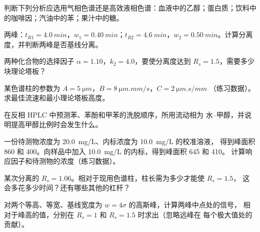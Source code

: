 \begin{exercise}[$\star$]\label{exo:b2:chromatography:4}
判断下列分析应选用气相色谱还是高效液相色谱：血液中的乙醇；蛋白质；饮料中的咖啡因；汽油中的苯；果汁中的糖。
\end{exercise}

\begin{exercise}[$\star\star$]\label{exo:b2:chromatography:5}
两峰：$t_{R1} = \qty{4.0}{min}$，$w_1 = \qty{0.40}{min}$；$t_{R2} = \qty{4.6}{min}$，$w_2 =
\qty{0.50}{min}$。计算分离度，并判断两峰是否基线分离。
\end{exercise}

\begin{exercise}[$\star\star$]\label{exo:b2:chromatography:6}
两种化合物的选择因子 $\alpha = 1.10$，$k_2 = 4.0$，要使分离度达到
$R_s = 1.5$，需要多少块理论塔板？
\end{exercise}

\begin{exercise}[$\star\star$]\label{exo:b2:chromatography:7}
某色谱柱的参数为 $A = \qty{5}{\micro m}$，$B = \qty{8}{\micro m.mm/s}$，$C = \qty{2}{\micro m.s/mm}$
（练习数据）。求最佳流速和最小理论塔板高度。
\end{exercise}

\begin{exercise}[$\star\star$]\label{exo:b2:chromatography:8}
在反相 HPLC 中预测苯、苯酚和甲苯的洗脱顺序，所用流动相为
水–甲醇，并说明提高甲醇比例时会发生什么。
\end{exercise}

\begin{exercise}[$\star\star$]\label{exo:b2:chromatography:9}
一份待测物浓度为 \qty{20.0}{mg/L}、内标浓度为 \qty{10.0}{mg/L} 的校准溶液，
得到峰面积 860 和 400。向样品中加入 \qty{10.0}{mg/L} 的内标，得到峰面积 645 和 410。
计算响应因子和待测物的浓度（练习数据）。
\end{exercise}

\begin{exercise}[$\star\star\star$]\label{exo:b2:chromatography:10}
某次分离的 $R_s = 1.06$。相对于现用色谱柱，柱长需为多少才能使 $R_s = 1.5$，
这会多花多少时间？还有哪些其他的杠杆？
\end{exercise}

\begin{exercise}[$\star\star\star$]\label{exo:b2:chromatography:11}
对两个等高、等宽、基线宽度为 $w = 4\sigma$ 的高斯峰，计算两峰中点处的信号，
相对于峰高的值，分别在 $R_s = 1$ 和 $R_s = 1.5$ 时求出（忽略远峰在
每个极大值处的贡献）。
\end{exercise}

